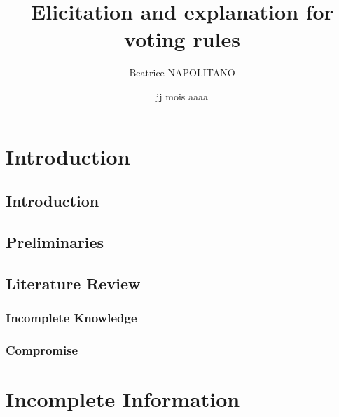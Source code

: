 \documentclass[a4paper, 11pt]{book}
\title{Elicitation and explanation for voting rules}
\author{Beatrice NAPOLITANO}
\institute{l'Université Paris-Dauphine}
\date{jj mois aaaa}
\begin{document}
\maketitle{}

\frontmatter

\begingroup
\hypersetup{hidelinks}

\tableofcontents

\listoffigures
{}

\listoftables
{}

\endgroup

\printglossary[toctitle=List of Abbreviations,title=List of Abbreviations,type=\acronymtype]

\mainmatter

\part{Introduction} 

	\chapter{Introduction}
		\label{ch:intro}
		
			
	\chapter{Preliminaries}
		\label{ch:preliminaries}
		
%		
	
	\chapter{Literature Review}
		\section{Incomplete Knowledge}
		\section{Compromise}
	
	
\part{Incomplete Information}
	\label{part:info}
\end{document}
